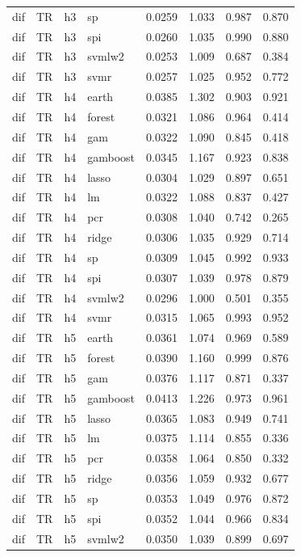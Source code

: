 \begin{ThreePartTable}
\begin{longtable}[t]{llclcccc}
dif & TR & h3 & sp & 0.0259 & 1.033 & 0.987 & 0.870\\
dif & TR & h3 & spi & 0.0260 & 1.035 & 0.990 & 0.880\\
dif & TR & h3 & svmlw2 & 0.0253 & 1.009 & 0.687 & 0.384\\
dif & TR & h3 & svmr & 0.0257 & 1.025 & 0.952 & 0.772\\
\addlinespace
dif & TR & h4 & earth & 0.0385 & 1.302 & 0.903 & 0.921\\
dif & TR & h4 & forest & 0.0321 & 1.086 & 0.964 & 0.414\\
dif & TR & h4 & gam & 0.0322 & 1.090 & 0.845 & 0.418\\
dif & TR & h4 & gamboost & 0.0345 & 1.167 & 0.923 & 0.838\\
dif & TR & h4 & lasso & 0.0304 & 1.029 & 0.897 & 0.651\\
dif & TR & h4 & lm & 0.0322 & 1.088 & 0.837 & 0.427\\
dif & TR & h4 & pcr & 0.0308 & 1.040 & 0.742 & 0.265\\
dif & TR & h4 & ridge & 0.0306 & 1.035 & 0.929 & 0.714\\
dif & TR & h4 & sp & 0.0309 & 1.045 & 0.992 & 0.933\\
dif & TR & h4 & spi & 0.0307 & 1.039 & 0.978 & 0.879\\
dif & TR & h4 & svmlw2 & 0.0296 & 1.000 & 0.501 & 0.355\\
dif & TR & h4 & svmr & 0.0315 & 1.065 & 0.993 & 0.952\\
\addlinespace
dif & TR & h5 & earth & 0.0361 & 1.074 & 0.969 & 0.589\\
dif & TR & h5 & forest & 0.0390 & 1.160 & 0.999 & 0.876\\
dif & TR & h5 & gam & 0.0376 & 1.117 & 0.871 & 0.337\\
dif & TR & h5 & gamboost & 0.0413 & 1.226 & 0.973 & 0.961\\
dif & TR & h5 & lasso & 0.0365 & 1.083 & 0.949 & 0.741\\
dif & TR & h5 & lm & 0.0375 & 1.114 & 0.855 & 0.336\\
dif & TR & h5 & pcr & 0.0358 & 1.064 & 0.850 & 0.332\\
dif & TR & h5 & ridge & 0.0356 & 1.059 & 0.932 & 0.677\\
dif & TR & h5 & sp & 0.0353 & 1.049 & 0.976 & 0.872\\
dif & TR & h5 & spi & 0.0352 & 1.044 & 0.966 & 0.834\\
dif & TR & h5 & svmlw2 & 0.0350 & 1.039 & 0.899 & 0.697\\

\end{longtable}
\end{ThreePartTable}

